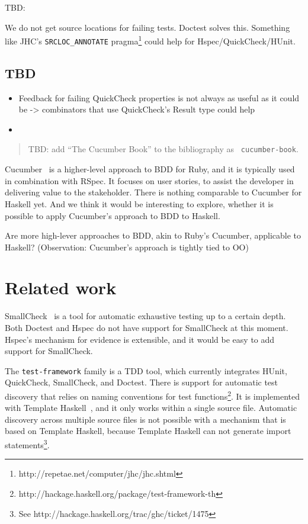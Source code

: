 \documentclass[preprint]{sigplanconf}
\begin{document}
TBD:

We do not get source locations for failing tests. Doctest solves this.
Something like JHC's
\verb|SRCLOC_ANNOTATE|
pragma\footnote{%
http://repetae.net/computer/jhc/jhc.shtml} could help
for Hspec/QuickCheck/HUnit.

\subsection{TBD}

\begin{itemize}
    \item
        Feedback for failing QuickCheck properties is not always as
        useful as it could be -> combinators that use QuickCheck's
        Result type could help
    \item
\end{itemize}

\begin{quote}
    TBD: add ``The Cucumber Book'' to the bibliography as {\tt
    cucumber-book}.
\end{quote}

Cucumber~\cite{cucumber-book} is a higher-level approach to BDD for Ruby, and
it is typically used in combination with RSpec.
It focuses on user stories, to assist the developer in delivering
value to the stakeholder.
There is nothing comparable to Cucumber for Haskell yet.  And we think
it would be interesting to explore, whether it is possible to apply
Cucumber's approach to BDD to Haskell.

Are more high-lever approaches to BDD, akin to Ruby's Cucumber,
applicable to Haskell? (Observation: Cucumber's approach is tightly
tied to OO)

\section{Related work}

SmallCheck~\cite{smallcheck} is a tool for
automatic exhaustive testing up to a certain depth.
Both Doctest and Hspec do not have support for SmallCheck
at this moment.
Hspec's mechanism for evidence is extensible, and it would be easy to
add support for SmallCheck.

The {\tt test-framework} family is a TDD tool, which currently
integrates HUnit, QuickCheck, SmallCheck, and Doctest.
There is support for automatic test discovery that relies on naming
conventions for test functions\footnote{%
http://hackage.haskell.org/package/test-framework-th}.  It is
implemented with Template Haskell~\cite{template-haskell}, and it only
works within a single source file.  Automatic discovery across
multiple source files is not possible with a mechanism that is based
on Template Haskell, because Template Haskell can not generate import
statements\footnote{%
See http://hackage.haskell.org/trac/ghc/ticket/1475 }.
\end{document}
